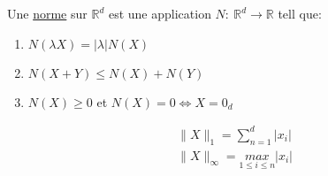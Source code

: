 \documentclass[a4paper]{report}
\newcommand\R{\ensuremath{\mathbb{R}}}
\let\iff\Leftrightarrow
\theoremstyle{definition}
\begin{document}
\begin{definition}
    Une \underline{norme} sur $\R^d$ est une application  $N: \: \R^d \to \R$ tell que:
    \begin{enumerate}
        \item $N(\lambda X) = |\lambda|N(X)$
        \item  $N(X + Y) \le N(X) + N(Y)$
        \item $N(X) \ge 0$ et $N(X) = 0 \iff X = 0_d$
    \end{enumerate}
\end{definition}
\begin{eg}
   \begin{align*}
       &\|X\|_1 = \sum_{n=1}^{d} |x_i|\\
       &\|X\|_{\infty} = \underset{1\le i \le n}{max} |x_i|
   \end{align*} 
\end{eg}
\end{document}
